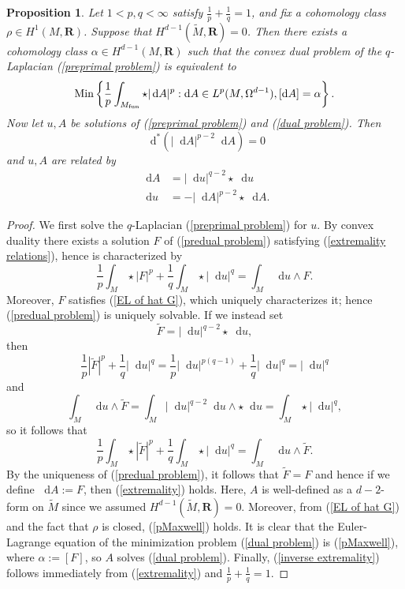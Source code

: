 \documentclass[reqno,11pt]{amsart}
\newcommand{\RR}{\mathbf{R}}
\newcommand*\dif{\mathop{}\!\mathrm{d}}
\newcommand{\Min}{\mathrm{Min}}
\newtheorem{proposition}[theorem]{Proposition}
\theoremstyle{definition}
\numberwithin{equation}{section}
\begin{document}
\begin{proposition}\label{convex duality}
Let $1 < p, q < \infty$ satisfy $\frac{1}{p} + \frac{1}{q} = 1$, and fix a cohomology class $\rho \in H^1(M, \RR)$.
Suppose that $H^{d - 1}(\tilde M, \RR) = 0$.
Then there exists a cohomology class $\alpha \in H^{d - 1}(M, \RR)$ such that the convex dual problem of the $q$-Laplacian (\ref{preprimal problem}) is equivalent to 
\begin{equation}\label{dual problem}
\Min\left\{\frac{1}{p} \int_{M_{\rm fun}} \star |\dif A|^p: \dif A \in L^p(M, \Omega^{d - 1}), [\dif A] = \alpha\right\}.
\end{equation}
Now let $u, A$ be solutions of (\ref{preprimal problem}) and (\ref{dual problem}). Then
\begin{equation}\label{pMaxwell}
\dif^*(|\dif A|^{p - 2} \dif A) = 0
\end{equation}
and $u, A$ are related by
\begin{align}
\dif A &= |\dif u|^{q - 2} \star \dif u \label{extremality} \\
\dif u &= -|\dif A|^{p - 2} \star \dif A. \label{inverse extremality}
\end{align}
\end{proposition}
\begin{proof}
We first solve the $q$-Laplacian (\ref{preprimal problem}) for $u$.
By convex duality \cite[Chapter III, Theorem 4.2]{Ekeland99} there exists a solution $F$ of (\ref{predual problem}) satisfying (\ref{extremality relations}), hence is characterized by 
$$\frac{1}{p} \int_M \star |F|^p + \frac{1}{q} \int_M \star |\dif u|^q = \int_M \dif u \wedge F.$$
Moreover, $F$ satisfies (\ref{EL of hat G}), which uniquely characterizes it; hence (\ref{predual problem}) is uniquely solvable.
If we instead set
$$\tilde F = |\dif u|^{q - 2} \star \dif u,$$
then 
$$\frac{1}{p} |\tilde F|^p + \frac{1}{q} |\dif u|^q = \frac{1}{p} |\dif u|^{p(q - 1)} + \frac{1}{q} |\dif u|^q = |\dif u|^q$$
and 
$$\int_M \dif u \wedge \tilde F = \int_M |\dif u|^{q - 2} \dif u \wedge \star \dif u = \int_M \star |\dif u|^q,$$
so it follows that 
$$\frac{1}{p} \int_M \star |\tilde F|^p + \frac{1}{q} \int_M \star |\dif u|^q = \int_M \dif u \wedge \tilde F.$$
By the uniqueness of (\ref{predual problem}), it follows that $\tilde F = F$ and hence if we define $\dif A := F$, then (\ref{extremality}) holds.
Here, $A$ is well-defined as a $d-2$-form on $\tilde M$ since we assumed $H^{d - 1}(\tilde M, \RR) = $0.
Moreover, from (\ref{EL of hat G}) and the fact that $\rho$ is closed, (\ref{pMaxwell}) holds.
It is clear that the Euler-Lagrange equation of the minimization problem (\ref{dual problem}) is (\ref{pMaxwell}), where $\alpha := [F]$, so $A$ solves (\ref{dual problem}).
Finally, (\ref{inverse extremality}) follows immediately from (\ref{extremality}) and $\frac{1}{p} + \frac{1}{q} = 1$.
\end{proof}
\end{document}

